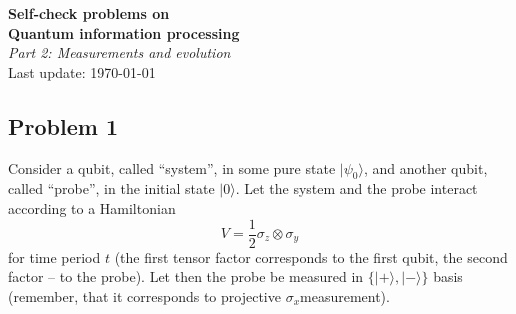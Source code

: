 \documentclass[a4paper,10pt]{article}
\newcommand{\ket}[1]{|#1\rangle}
\begin{document}
\begin{center}
\Large{{\bf Self-check problems on\\  Quantum information processing}\\{\it Part 2: Measurements and evolution}}\\
\vspace{5pt}
\large{Last update: \today}
\end{center}

\subsection*{Problem 1}
Consider a qubit, called ``system'', in some pure state $\ket{\psi_{0}}$, and another qubit, called ``probe'', in the initial state $\ket{0}$.
Let the system and the probe interact according to a Hamiltonian 
\begin{equation}
	V=\frac{1}{2}\sigma_{z}\otimes\sigma_{y}
\end{equation} 
for time period $t$ (the first tensor factor corresponds to the first qubit, the second factor -- to the probe).
Let then the probe be measured in $\{\ket{+}, \ket{-}\}$ basis (remember, that it corresponds to projective $\sigma_{x}$measurement).
\end{document}
